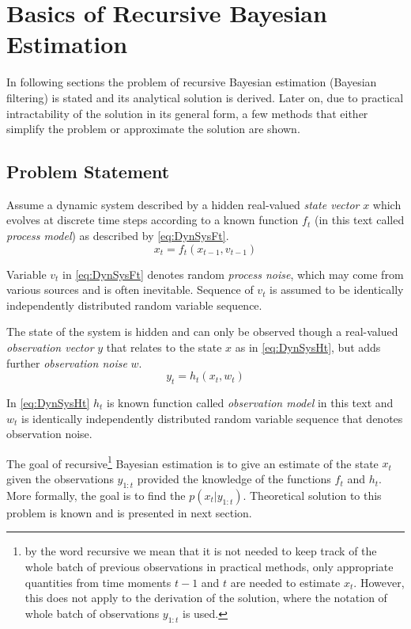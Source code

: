 \chapter{Basics of Recursive Bayesian Estimation}

In following sections the problem of recursive Bayesian estimation (Bayesian filtering) is
stated and its analytical solution is derived. Later on, due to practical intractability of the
solution in its general form, a few methods that either simplify the problem or approximate the
solution are shown.

\section{Problem Statement}

Assume a dynamic system described by a hidden real-valued \emph{state vector} \(x\) which evolves at
discrete time steps according to a known function \(f_t\) (in this text called \emph{process model})
as described by \eqref{eq:DynSysFt}.
\begin{equation} \label{eq:DynSysFt}
	x_t = f_t(x_{t-1}, v_{t-1})
\end{equation}

Variable \(v_t\) in \eqref{eq:DynSysFt} denotes random \emph{process noise}, which may come from various
sources and is often inevitable. Sequence of \(v_t\) is assumed to be identically independently
distributed random variable sequence.

The state of the system is hidden and can only be observed though a real-valued \emph{observation vector}
\(y\) that relates to the state \(x\) as in \eqref{eq:DynSysHt}, but adds further \emph{observation
noise} \(w\).
\begin{equation} \label{eq:DynSysHt}
	y_t = h_t(x_t, w_t)
\end{equation}

In \eqref{eq:DynSysHt} \(h_t\) is known function called \emph{observation model} in this text and \(w_t\) is
identically independently distributed random variable sequence that denotes observation noise.

The goal of recursive\footnote{by the word recursive we mean that it is not needed to keep track of
the whole batch of previous observations in practical methods, only appropriate quantities from time
moments \(t-1\) and \(t\) are needed to estimate \(x_t\). However, this does not apply to the
derivation of the solution, where the notation of whole batch of observations \(y_{1:t}\) is used.}
Bayesian estimation is to give an estimate of the state \(x_t\) given the
observations \(y_{1:t}\) provided the knowledge of the functions \(f_t\) and \(h_t\).
More formally, the goal is to find the {\pdf} \(p(x_t | y_{1:t})\).
Theoretical solution to this problem is known and is presented in next section.

